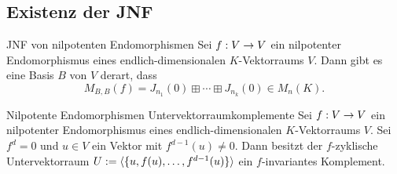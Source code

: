 \documentclass[main.tex]{subfiles}
\begin{document}
\subsection*{Existenz der JNF}

\begin{karte}{JNF von nilpotenten Endomorphismen}
    Sei \(f : V \rightarrow V\) ein nilpotenter Endomorphismus eines endlich-dimensionalen
    \(K\)-Vektorraums \(V\). Dann gibt es eine Basis \(B\) von \(V\) derart, dass
    \[ M_{B,B}(f) = J_{n_1}(0) \boxplus \cdots \boxplus J_{n_k}(0) \in M_n(K). \]
\end{karte}

\begin{karte}{Nilpotente Endomorphismen Untervektorraumkomplemente}
    Sei \(f : V \rightarrow V\) ein nilpotenter Endomorphismus eines endlich-dimensionalen
    \(K\)-Vektorraums \(V\). Sei \(f^d = 0\) und \(u \in V\) ein Vektor mit
    \(f^{d-1}(u) \neq 0\). Dann besitzt der \(f\)-zyklische Untervektorraum
    \(U := \langle \{u, f(u), \ldots, f^{d-1}(u)\}\rangle\) ein \(f\)-invariantes
    Komplement.
\end{karte}
\end{document}
